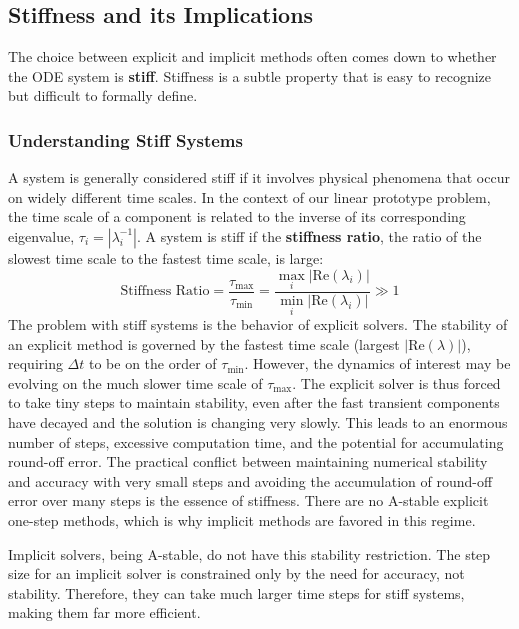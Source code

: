 \subsection{Stiffness and its Implications}
\label{subsec:ivp-stiffness}
The choice between explicit and implicit methods often comes down to whether the ODE system is \textbf{stiff}. Stiffness is a subtle property that is easy to recognize but difficult to formally define.

\subsubsection{Understanding Stiff Systems}
A system is generally considered stiff if it involves physical phenomena that occur on widely different time scales. In the context of our linear prototype problem, the time scale of a component is related to the inverse of its corresponding eigenvalue, $\tau_i = |\lambda_i^{-1}|$. A system is stiff if the \textbf{stiffness ratio}, the ratio of the slowest time scale to the fastest time scale, is large:
\begin{equation}
    \text{Stiffness Ratio} = \frac{\tau_{\text{max}}}{\tau_{\text{min}}} = \frac{\max_i |\text{Re}(\lambda_i)|}{\min_i |\text{Re}(\lambda_i)|} \gg 1
\end{equation}
The problem with stiff systems is the behavior of explicit solvers. The stability of an explicit method is governed by the fastest time scale (largest $|\mathrm{Re}(\lambda)|$), requiring $\Delta t$ to be on the order of $\tau_{\min}$. However, the dynamics of interest may be evolving on the much slower time scale of $\tau_{\max}$. The explicit solver is thus forced to take tiny steps to maintain stability, even after the fast transient components have decayed and the solution is changing very slowly. This leads to an enormous number of steps, excessive computation time, and the potential for accumulating round-off error. The practical conflict between maintaining numerical stability and accuracy with very small steps and avoiding the accumulation of round-off error over many steps is the essence of stiffness. There are no A-stable explicit one-step methods, which is why implicit methods are favored in this regime.

Implicit solvers, being A-stable, do not have this stability restriction. The step size for an implicit solver is constrained only by the need for accuracy, not stability. Therefore, they can take much larger time steps for stiff systems, making them far more efficient.

